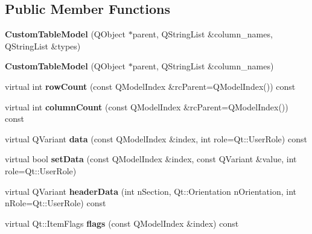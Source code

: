 \subsection*{Public Member Functions}
\begin{DoxyCompactItemize}
\item 
\mbox{\label{class_custom_table_model_a7a3b36ca24291f821f064a733ce4a5d3}} 
{\bfseries Custom\+Table\+Model} (Q\+Object $\ast$parent, Q\+String\+List \&column\+\_\+names, Q\+String\+List \&types)
\item 
\mbox{\label{class_custom_table_model_a3c0eeb384e13eeddf21ad37f9bc1c565}} 
{\bfseries Custom\+Table\+Model} (Q\+Object $\ast$parent, Q\+String\+List \&column\+\_\+names)
\item 
\mbox{\label{class_custom_table_model_a494801afcf3c25ca9befd159fb32527d}} 
virtual int {\bfseries row\+Count} (const Q\+Model\+Index \&rc\+Parent=Q\+Model\+Index()) const
\item 
\mbox{\label{class_custom_table_model_a50a175468f40478f75d84caf0f341b20}} 
virtual int {\bfseries column\+Count} (const Q\+Model\+Index \&rc\+Parent=Q\+Model\+Index()) const
\item 
\mbox{\label{class_custom_table_model_a7dec8d4c9b036b46d8e5ba045fa245bf}} 
virtual Q\+Variant {\bfseries data} (const Q\+Model\+Index \&index, int role=Qt\+::\+User\+Role) const
\item 
\mbox{\label{class_custom_table_model_ac7cc493ed26bdb34beacd82fc4565371}} 
virtual bool {\bfseries set\+Data} (const Q\+Model\+Index \&index, const Q\+Variant \&value, int role=Qt\+::\+User\+Role)
\item 
\mbox{\label{class_custom_table_model_a59aa7112f03780da11d4cb4163d9c79d}} 
virtual Q\+Variant {\bfseries header\+Data} (int n\+Section, Qt\+::\+Orientation n\+Orientation, int n\+Role=Qt\+::\+User\+Role) const
\item 
\mbox{\label{class_custom_table_model_a9be3af7745a5a8cd7a75fa7c9b5d81ba}} 
virtual Qt\+::\+Item\+Flags {\bfseries flags} (const Q\+Model\+Index \&index) const

\end{DoxyCompactItemize}

